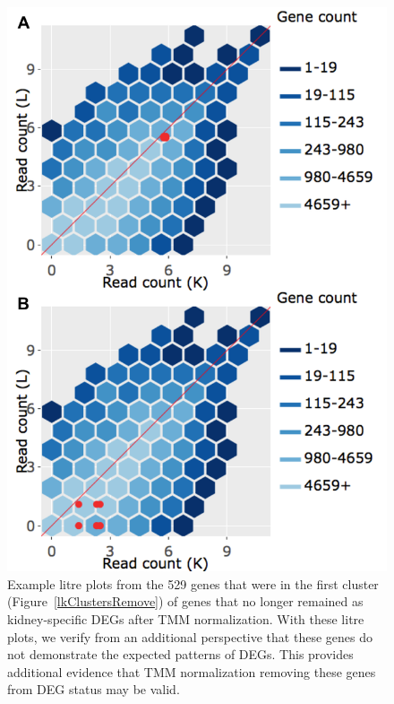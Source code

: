 \documentclass[11pt,a4paper,oldfontcommands,openany]{memoir}
\numberwithin{equation}{section} %
\begin{document}
\null
\begin{figure}[t!]
\begin{framed}
\centerline{\includegraphics[width=0.7\columnwidth]{MakeFigures/Dashboards/litreClusterRemove/litreClusterRemove.jpg}}
\end{framed}
\caption{Example litre plots from the 529 genes that were in the first cluster (Figure~\ref{lkClustersRemove}) of genes that no longer remained as kidney-specific DEGs after TMM normalization. With these litre plots, we verify from an additional perspective that these genes do not demonstrate the expected patterns of DEGs. This provides additional evidence that TMM normalization removing these genes from DEG status may be valid.
\label{litreClusterRemove}}
\end{figure}
\end{document}
